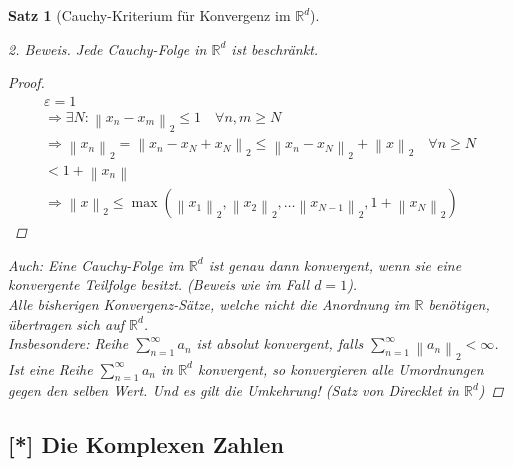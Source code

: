 \documentclass[11pt, twoside, a4paper]{article}
\theoremstyle{plain}
\newtheorem{satz}[blockelement]{Satz}
\newcommand{\pair}[1]{\left(#1\right)}
\newcommand{\norm}[1]{\left\lVert#1\right\rVert}
\newcommand{\impl}[0]{\Rightarrow{}}
\newcommand{\R}{\mathbb{R}}
\begin{document}
\begin{satz}[Cauchy-Kriterium für Konvergenz im $\R^d$]
\begin{proof}[2. Beweis]
            Jede Cauchy-Folge in $\R^d$ ist beschränkt.
            \begin{proof}
                \begin{align*}
                    \varepsilon = 1\\
                    \impl \exists N\colon\norm{x_n-x_m}_2 \leq 1\quad\forall n,m\geq N\\
                    \impl \norm{x_n}_2 = \norm{x_n-x_N+x_N}_2 \leq \norm{x_n-x_N}_2 + \norm{x}_2\quad\forall n\geq N\\
                    < 1 + \norm{x_n}\\
                    \impl \norm{x}_2 \leq \max\pair{\norm{x_1}_2, \norm{x_2}_2,\dots\norm{x_{N-1}}_2, 1+\norm{x_N}_2}
                \end{align*}
            \end{proof}
            Auch: Eine Cauchy-Folge im $\R^d$ ist genau dann konvergent, wenn sie eine konvergente Teilfolge besitzt. (Beweis wie im Fall $d=1$).\\
            Alle bisherigen Konvergenz-Sätze, welche nicht die Anordnung im $\R$ benötigen, übertragen sich auf $\R^d$.\\
            Insbesondere: Reihe $\sum_{n=1}^{\infty} a_n$ ist absolut konvergent, falls $\sum_{n=1}^{\infty} \norm{a_n}_2 < \infty$.\\
            Ist eine Reihe $\sum_{n=1}^{\infty} a_n$ in $\R^d$ konvergent, so konvergieren alle Umordnungen gegen den selben Wert. Und es gilt die Umkehrung! (Satz von Direcklet in $\R^d$)
        \end{proof}
    \end{satz}

    \subsection{[*] Die Komplexen Zahlen}
\end{document}
